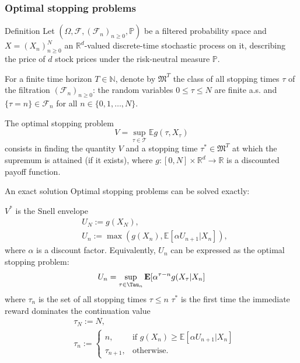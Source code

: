\documentclass[9pt]{beamer} %
\newcommand{\gooditem}[1]{\setbeamercolor{item}{fg=darkred}\item #1}
\begin{document}
\begin{frame}
\frametitle{Optimal stopping problems}

\begin{block}{Definition}
Let $(\Omega, \mathcal{F},(\mathcal{F}_n)_{n\geq 0},\mathbb{P})$ be a filtered probability space and $X = (X_n)_{n\geq 0}^N $ an $\mathbb{R}^d$-valued discrete-time stochastic process on it, describing the price of $d$ stock prices under the risk-neutral measure $\mathbb{P}$.

\medskip
For a finite time horizon $T \in \mathbb{N}$, denote by $\mathfrak{M}^T$ the class of all stopping times $\tau$ of the filtration $(\mathcal{F}_n)_{n\geq 0}$: the random variables $0 \leq \tau \leq N$ are finite a.s. and $\{\tau = n \} \in \mathcal{F}_n$ for all $n \in \{ 0, 1, \ldots, N\}$.

\medskip
The optimal stopping problem
\begin{equation}\label{eq1}
    V=\sup_{\tau \in \mathcal{T}} \mathbb{E} g(\tau, X_{\tau})
\end{equation}
consists in finding the quantity $V$ and a stopping time $\tau^{\ast} \in \mathfrak{M}^T$ at which the supremum is attained (if it exists), where $g: [0,N] \times \mathbb{R}^d \rightarrow \mathbb{R}$ is a discounted payoff function.
\end{block}
\end{frame}

\begin{frame}{An exact solution}
   Optimal stopping problems can be solved exactly:
   \begin{itemize}
       \gooditem $V^{\ast}$ is the Snell envelope
       \begin{equation}\label{eq2}
       \begin{split}
           &U_N := g(X_N),\\
           &U_n := \max (g(X_n), \mathbb{E}[\alpha U_{n+1} | X_n]),
       \end{split}   
       \end{equation}
       where $\alpha$ is a discount factor. Equivalently, $U_n$ can be expressed as the optimal stopping problem:
       \begin{equation}\label{eq3}
           U_n = \sup_{\tau \in \Tau_n} \mathbf{E}[\alpha^{\tau - n}g(X_{\tau}| X_n]
       \end{equation}
       where $\tau_n$ is the set of all stopping times $\tau \leq n$
       \gooditem $\tau^{\ast}$ is the first time the immediate reward dominates the continuation value
       \begin{equation}\label{eq4}
       \begin{split}
       &\tau_N := N,\\
       &\tau_n := \begin{cases} 
       n, & \mbox{if } g(X_n) \geq \mathbb{E}[\alpha U_{n+1}| X_n] \\ 
       \tau_{n+1}, & \mbox{otherwise.}  \end{cases}
       \end{split}
       \end{equation}
   \end{itemize}
\end{frame}
\end{document}
